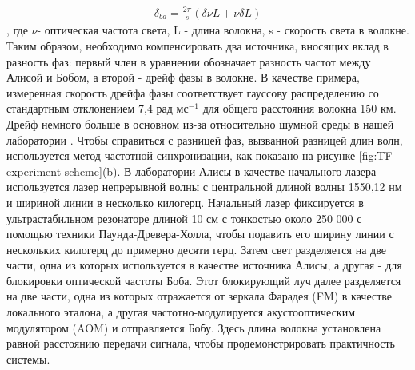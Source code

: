 \begin{align}
    \delta_{ba} = \frac{2\pi}{s}(\delta\nu L + \nu\delta L)
\end{align}\label{eq: TF phase fluct lit},
 где $\nu$- оптическая частота света, L - длина волокна, s - скорость света в волокне. Таким образом, необходимо компенсировать два источника, вносящих вклад в разность фаз: первый член в уравнении обозначает разность частот между Алисой и Бобом, а второй - дрейф фазы в волокне. В качестве примера, измеренная скорость дрейфа фазы соответствует гауссову распределению со стандартным отклонением 7,4 рад $мс^{-1}$ для общего расстояния волокна 150 км. Дрейф немного больше в основном из-за относительно шумной среды в нашей лаборатории . Чтобы справиться с разницей фаз, вызванной разницей длин волн, используется метод частотной синхронизации, как показано на рисунке \ref{fig:TF experiment scheme}(b). В лаборатории Алисы в качестве начального лазера используется лазер непрерывной волны с центральной длиной волны 1550,12 нм и шириной линии в несколько килогерц. Начальный лазер фиксируется в ультрастабильном резонаторе длиной 10 см с тонкостью около 250 000 с помощью техники Паунда-Древера-Холла, чтобы подавить его ширину линии с нескольких килогерц до примерно десяти герц. Затем свет разделяется на две части, одна из которых используется в качестве источника Алисы, а другая - для блокировки оптической частоты Боба. Этот блокирующий луч далее разделяется на две части, одна из которых отражается от зеркала Фарадея (FM) в качестве локального эталона, а другая частотно-модулируется акустооптическим модулятором (AOM) и отправляется Бобу. Здесь длина волокна установлена равной расстоянию передачи сигнала, чтобы продемонстрировать практичность системы.

